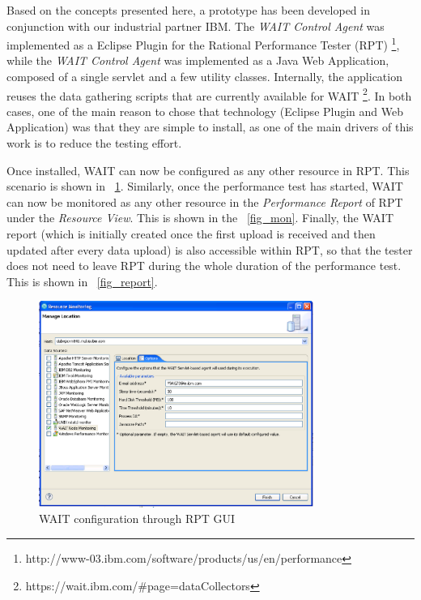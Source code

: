 \documentclass[runningheads,a4paper]{llncs}
\begin{document}
Based on the concepts presented here, a prototype has been developed in
conjunction with our industrial partner IBM. The \emph{WAIT Control Agent} was
implemented as a Eclipse Plugin for the Rational Performance Tester (RPT)
\footnote{http://www-03.ibm.com/software/products/us/en/performance},
while the \emph{WAIT Control Agent} was implemented as a Java Web Application,
composed of a single servlet and a few utility classes. Internally, the
application reuses the data gathering scripts that are currently available for
WAIT \footnote{https://wait.ibm.com/\#page=dataCollectors}. In both cases,
one of the main reason to chose that technology (Eclipse Plugin and Web
Application) was that they are simple to install, as one of the main drivers of
this work is to reduce the testing effort.

Once installed, WAIT can now be configured as any other resource in RPT. This
scenario is shown in \figurename ~\ref{fig_config}. Similarly, once the performance
test has started, WAIT can now be monitored as any other resource in the
\emph{Performance Report} of RPT under the \emph{Resource View}. This is shown
in the \figurename ~\ref{fig_mon}. Finally, the WAIT report (which is initially created 
once the first upload is received and then updated after every data
upload) is also accessible within RPT, so that the tester does not need to
leave RPT during the whole duration of the performance test. This is shown
in \figurename ~\ref{fig_report}.

\begin{figure}[!h]
\centering
\includegraphics[totalheight=.3\textheight,width=0.8\textwidth]{WAIT-config}
\caption{WAIT configuration through RPT GUI}
\label{fig_config}
\end{figure}
\end{document}

